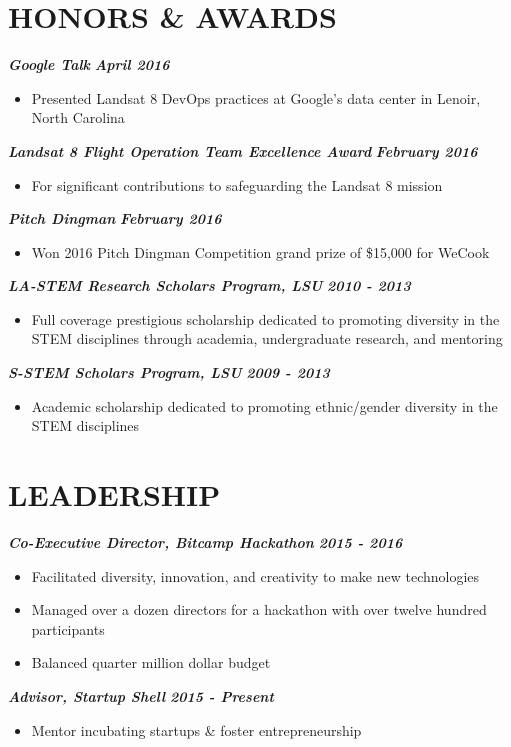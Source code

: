 \documentclass{res}
\begin{document}
\begin{resume}
\section{HONORS \& AWARDS}
	{\bfseries {\em Google Talk}} \hfill {\bfseries {\em April 2016}} \
		\begin{itemize} \itemsep -2pt %
		\item Presented Landsat 8 DevOps practices at Google's data center in Lenoir, North Carolina
		\end{itemize}
  	{\bfseries {\em Landsat 8 Flight Operation Team Excellence Award}} \hfill {\bfseries {\em February 2016}} \
		\begin{itemize} \itemsep -2pt %
		\item For significant contributions to safeguarding the Landsat 8 mission
		\end{itemize}
	{\bfseries {\em Pitch Dingman}} \hfill {\bfseries {\em February 2016}} \
		\begin{itemize} \itemsep -2pt %
		\item Won 2016 Pitch Dingman Competition grand prize of \$15,000 for WeCook
		\end{itemize}
  	{\bfseries {\em LA-STEM Research Scholars Program, LSU}} \hfill {\bfseries {\em 2010 - 2013}} \
		\begin{itemize} \itemsep -2pt %
		\item Full coverage prestigious scholarship dedicated to promoting diversity in the STEM disciplines through academia, undergraduate research, and mentoring
		\end{itemize}
	{\bfseries {\em S-STEM Scholars Program, LSU}} \hfill {\bfseries {\em 2009 - 2013}} \
		\begin{itemize} \itemsep -2pt %
		\item Academic scholarship dedicated to promoting ethnic/gender diversity in the STEM disciplines
		\end{itemize}

\section{LEADERSHIP}
  	{\bfseries {\em Co-Executive Director, Bitcamp Hackathon}} \hfill {\bfseries {\em 2015 - 2016}} \
		\begin{itemize} \itemsep -2pt %
		\item Facilitated diversity, innovation, and creativity to make new technologies
		\item Managed over a dozen directors for a hackathon with over twelve hundred participants
		\item Balanced quarter million dollar budget
		\end{itemize}
	{\bfseries {\em Advisor, Startup Shell}} \hfill {\bfseries {\em 2015 - Present}} \
		\begin{itemize} \itemsep -2pt %
		\item Mentor incubating startups \& foster entrepreneurship
		\end{itemize}

\end{resume}
\end{document}
